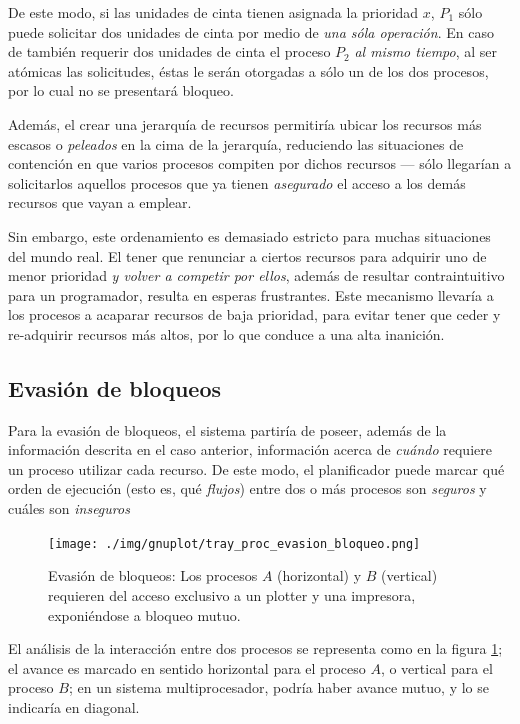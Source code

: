 \documentclass[11pt,fleqn]{book} %
\begin{document}
De este modo, si las unidades de cinta tienen asignada la prioridad
$x$, $P_1$ sólo puede solicitar dos unidades de cinta por medio de
\emph{una sóla operación}. En caso de también requerir dos unidades de
cinta el proceso $P_2$ \emph{al mismo tiempo}, al ser atómicas las
solicitudes, éstas le serán otorgadas a sólo un de los dos procesos,
por lo cual no se presentará bloqueo.

Además, el crear una jerarquía de recursos permitiría ubicar los
recursos más escasos o \emph{peleados} en la cima de la jerarquía,
reduciendo las situaciones de contención en que varios procesos
compiten por dichos recursos — sólo llegarían a solicitarlos aquellos
procesos que ya tienen \emph{asegurado} el acceso a los demás recursos que
vayan a emplear.

Sin embargo, este ordenamiento es demasiado estricto para muchas
situaciones del mundo real. El tener que renunciar a ciertos recursos
para adquirir uno de menor prioridad \emph{y volver a competir por ellos},
además de resultar contraintuitivo para un programador, resulta en
esperas frustrantes. Este mecanismo llevaría a los procesos a acaparar
recursos de baja prioridad, para evitar tener que ceder y re-adquirir
recursos más altos, por lo que conduce a una alta inanición.
\subsection{Evasión de bloqueos}
\label{sec-3-4-2}


Para la evasión de bloqueos, el sistema partiría de poseer, además de
la información descrita en el caso anterior, información acerca de
\emph{cuándo} requiere un proceso utilizar cada recurso. De este modo, el
planificador puede marcar qué orden de ejecución (esto es, qué
\emph{flujos}) entre dos o más procesos son \emph{seguros} y cuáles son
\emph{inseguros}

\begin{figure}[htb]
\centering
\texttt{[image: ./img/gnuplot/tray\_proc\_evasion\_bloqueo.png]}
\caption{\label{PROC_tray_proc_evasion_bloqueo}Evasión de bloqueos: Los procesos $A$ (horizontal) y $B$ (vertical) requieren del acceso exclusivo a un plotter y una impresora, exponiéndose a bloqueo mutuo.}
\end{figure}

El análisis de la interacción entre dos procesos se representa como en
la figura \ref{PROC_tray_proc_evasion_bloqueo}; el avance es marcado
en sentido horizontal para el proceso $A$, o vertical para el proceso
$B$; en un sistema multiprocesador, podría haber avance mutuo, y lo
se indicaría en diagonal.
\end{document}
